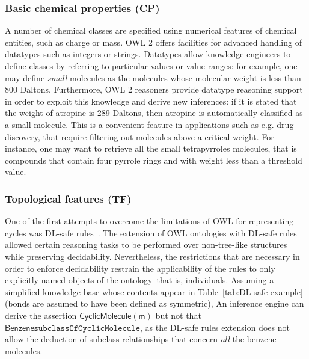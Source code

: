\documentclass[10pt]{bmc_article}
\newenvironment{bmcformat}{\baselineskip20pt\sloppy\setboolean{publ}{false}}{\baselineskip20pt\sloppy}
\begin{document}
\begin{bmcformat}
\subsubsection*{Basic chemical properties (CP)}

A number of chemical classes are specified using numerical features of chemical entities, such as charge or mass. OWL 2
offers facilities for advanced handling of datatypes such as integers or strings. Datatypes allow knowledge engineers to define classes by referring to particular values or value ranges: for example, one may define \emph{small} molecules as the molecules whose molecular weight is less than 800 Daltons. 
Furthermore, OWL 2 reasoners provide datatype reasoning support~\cite{Motik2008} in order to exploit this knowledge and derive new inferences: if it is stated that the weight of atropine is 289 Daltons, then atropine is automatically classified as a small molecule. 
This is a convenient feature in applications such as e.g. drug discovery, that require filtering out molecules above a critical weight. For instance, one may want to retrieve all the small tetrapyrroles molecules, that is compounds that contain four pyrrole rings and with weight less than a threshold value.%

\subsubsection*{Topological features (TF)}
\label{subsubsec:cycles}

One of the first attempts to overcome the limitations of OWL for representing cycles was DL-safe rules~\cite{DLSafeBoris}. The extension of OWL ontologies with DL-safe rules allowed certain reasoning tasks to be performed over non-tree-like structures while preserving decidability. Nevertheless, the restrictions that are necessary in order to enforce decidability restrain the applicability of the rules to only explicitly named objects of the ontology--that is, individuals. Assuming a simplified knowledge base whose contents appear in Table~\ref{tab:DL-safe-example} (bonds are assumed to have been defined as symmetric), %
An inference engine can derive the assertion $\mathsf{CyclicMolecule(m)}$ but not that $\mathsf{Benzene} \texttt{subclassOf} \texttt{CyclicMolecule}$, as the DL-safe rules extension does not allow the deduction of subclass relationships that concern \emph{all} the benzene molecules. 


\end{bmcformat}
\end{document}
